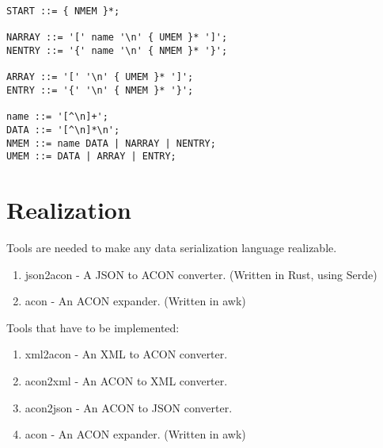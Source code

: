 \documentclass[listof=totoc]{article}
\begin{document}
\begin{verbatim}
START ::= { NMEM }*;

NARRAY ::= '[' name '\n' { UMEM }* ']';
NENTRY ::= '{' name '\n' { NMEM }* '}';

ARRAY ::= '[' '\n' { UMEM }* ']';
ENTRY ::= '{' '\n' { NMEM }* '}';

name ::= '[^\n]+';
DATA ::= '[^\n]*\n';
NMEM ::= name DATA | NARRAY | NENTRY;
UMEM ::= DATA | ARRAY | ENTRY;
\end{verbatim}

\section{Realization}
\noindent Tools are needed to make any data serialization language realizable.

\begin{enumerate}
  \item json2acon - A JSON to ACON converter. (Written in Rust, using Serde)
  \item acon - An ACON expander. (Written in awk)
\end{enumerate}

\noindent Tools that have to be implemented:
\begin{enumerate}
  \item xml2acon - An XML to ACON converter.
  \item acon2xml - An ACON to XML converter.
  \item acon2json - An ACON to JSON converter.
  \item acon - An ACON expander. (Written in awk)
\end{enumerate}


\lstlistoflistings



\end{document}
